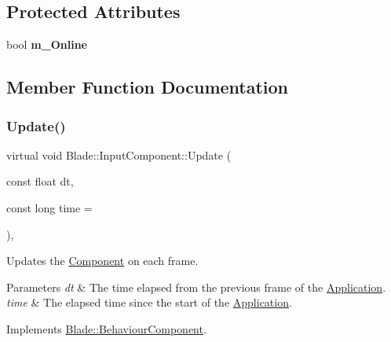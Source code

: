 \subsection*{Protected Attributes}
\begin{DoxyCompactItemize}
\item 
\mbox{\label{class_blade_1_1_input_component_a4b9e54157a5526fb929d5105c4d8447e}} 
bool {\bfseries m\+\_\+\+Online}
\end{DoxyCompactItemize}


\subsection{Member Function Documentation}
\mbox{\label{class_blade_1_1_input_component_aa7869b52200bb0a8c0c304fdf6147098}} 
\subsubsection{\texorpdfstring{Update()}{Update()}}
{\footnotesize\ttfamily virtual void Blade\+::\+Input\+Component\+::\+Update (\begin{DoxyParamCaption}\item[{const float}]{dt,  }\item[{const long}]{time = {} }\end{DoxyParamCaption})\hspace{0.3cm}{\ttfamily [pure virtual]}, {\ttfamily [noexcept]}}



Updates the \hyperlink{class_blade_1_1_component}{Component} on each frame. 


\begin{DoxyParams}{Parameters}
{\em dt} & The time elapsed from the previous frame of the \hyperlink{class_blade_1_1_application}{Application}. \\
\hline
{\em time} & The elapsed time since the start of the \hyperlink{class_blade_1_1_application}{Application}. \\
\hline
\end{DoxyParams}


Implements \hyperlink{class_blade_1_1_behaviour_component_a90ec3079534ea1f7225c676881b30c17}{Blade\+::\+Behaviour\+Component}.



